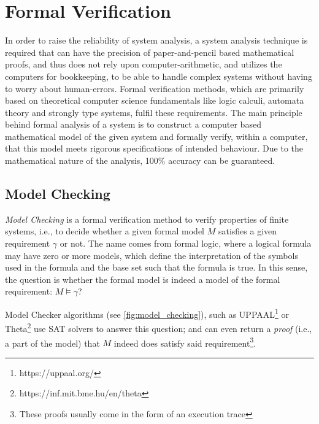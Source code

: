 \section{Formal Verification}\label{sec:formal_verification}

In order to raise the reliability of system analysis, a system analysis technique is required that can have the precision of paper-and-pencil based mathematical proofs, and thus does not rely upon computer-arithmetic, and utilizes the computers for bookkeeping, to be able to handle complex systems without having to worry about human-errors. Formal verification methods, which are primarily based on theoretical computer science fundamentals like logic calculi, automata theory and strongly type systems, fulfil these requirements. The main principle behind formal analysis of a system is to construct a computer based mathematical model of the given system and formally verify, within a computer, that this model meets rigorous specifications of intended behaviour. Due to the mathematical nature of the analysis, 100\% accuracy can be guaranteed.\cite{https://doi:10.4018/978-1-4666-5888-2.ch705}

\subsection{Model Checking}

\emph{Model Checking} is a formal verification method to verify properties of finite systems, i.e., to decide whether a given formal model \(M\) satisfies a given requirement \(\gamma\) or not. The name comes from formal logic, where a logical formula may have zero or more models, which define the interpretation of the symbols used in the formula and the base set such that the formula is true. In this sense, the question is whether the formal model is indeed a model of the formal requirement: \(M \models \gamma\)?

Model Checker algorithms (see \autoref{fig:model_checking}), such as UPPAAL\footnote{https://uppaal.org/}\cite{uppaal} or Theta\footnote{https://inf.mit.bme.hu/en/theta}\cite{theta} use SAT solvers to answer this question; and can even return a \emph{proof} (i.e., a part of the model) that \(M\) indeed does satisfy said requirement\footnote{These proofs usually come in the form of an execution trace}.

